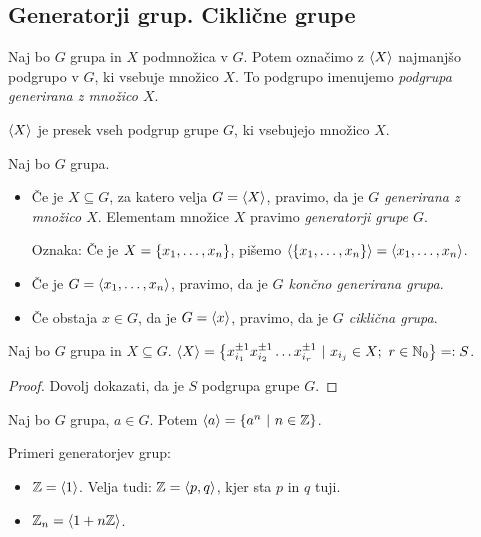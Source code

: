 \newpage
\subsection{Generatorji grup. Ciklične grupe}

\begin{definicija}
    Naj bo $G$ grupa in $X$ podmnožica v $G$. Potem označimo z $\left\langle {X} \right\rangle$ najmanjšo podgrupo v $G$, ki vsebuje množico $X$. To podgrupo imenujemo \emph{podgrupa generirana z množico $X$}.
\end{definicija}

\begin{opomba}
    $\left\langle {X} \right\rangle$ je presek vseh podgrup grupe $G$, ki vsebujejo množico $X$.
\end{opomba}

\begin{definicija}
    Naj bo $G$ grupa. 
    
    \begin{itemize}
        \item Če je $X \subseteq G$, za katero velja $G = \left\langle {X} \right\rangle$, pravimo, da je \emph{$G$ generirana z množico $X$}. Elementam množice $X$ pravimo \emph{generatorji grupe $G$}.
        
        Oznaka: Če je $X = \left\{x_1, \ldots, x_n\right\}$, pišemo $\left\langle {\left\{x_1, \ldots, x_n\right\}} \right\rangle = \left\langle {x_1, \ldots, x_n} \right\rangle$.
        \item Če je $G = \left\langle {x_1, \ldots, x_n} \right\rangle$, pravimo, da je \emph{$G$ končno generirana grupa}.
        \item Če obstaja $x \in G$, da je $G = \left\langle {x} \right\rangle$, pravimo, da je \emph{$G$ ciklična grupa}.
    \end{itemize}    
\end{definicija}

\begin{trditev}
    Naj bo $G$ grupa in $X \subseteq G$. $\left\langle {X} \right\rangle = \left\{x_{i_1}^{\pm 1} x_{i_2}^{\pm 1} \ldots x_{i_r}^{\pm 1} \ | \ x_{i_j} \in X; \ r \in \mathbb{N}_0\right\} =: S$.
\end{trditev}

\begin{proof}
    Dovolj dokazati, da je $S$ podgrupa grupe $G$.
\end{proof}

\begin{posledica}
    Naj bo $G$ grupa, $a \in G$. Potem $\left\langle {a} \right\rangle = \left\{a^n \ | \ n \in \mathbb{Z}\right\}$.
\end{posledica}

\begin{primer}
    Primeri generatorjev grup:
    \begin{itemize}
        \item $\mathbb{Z} = \left\langle {1} \right\rangle$. Velja tudi: $\mathbb{Z} = \left\langle {p, q} \right\rangle$, kjer sta $p$ in $q$ tuji.
        \item $\mathbb{Z}_n = \left\langle {1 + n\mathbb{Z}} \right\rangle$.
    \end{itemize}
\end{primer}

